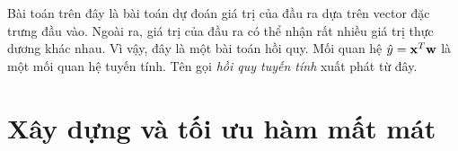
Bài toán trên đây là bài toán dự đoán giá trị của đầu ra dựa trên vector đặc
trưng đầu vào. Ngoài ra, giá trị của đầu ra có thể nhận rất nhiều giá trị thực
dương khác nhau. Vì vậy, đây là một bài toán hồi quy. Mối quan hệ $\hat{y} =
\mathbf{x}^T\mathbf{w}$ là một mối quan hệ tuyến tính. Tên gọi \textit{hồi quy tuyến tính}
xuất phát từ đây.







\section{Xây dựng và tối ưu hàm mất mát}


